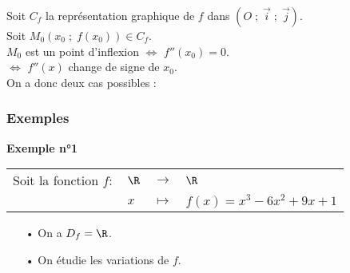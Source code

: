 Soit $C_f$ la représentation graphique de $f$ dans $\left(O \; ; \; \overrightarrow{i} \; ; \; \overrightarrow{j}\right)$. \\

Soit $M_0\left(x_0 \; ; \; f\left(x_0\right)\right) \in C_f$. \\

$M_0$ est un point d'inflexion $\Longleftrightarrow$ $f''(x_0) = 0$. \\ \hspace*{4.27cm} $\Longleftrightarrow$ $f''(x)$ change de signe de $x_0$.  \\

On a donc deux cas possibles : \\


\vspace*{.3cm}


\newpage

\subsubsection{Exemples}

\textbf{Exemple n°1} \\

\begin{tabular}{llll}
Soit la fonction $f:$ & $\R$ & $\longrightarrow$ & $\R$ \\
& $x$ & $\longmapsto$ & $f(x) = x^3 - 6x^2 + 9x +1$ \\
\end{tabular}

\begin{itemize}
\item[•] On a $D_f = \R$. \\

\item[•] On étudie les variations de $f$. \\
\end{itemize}

